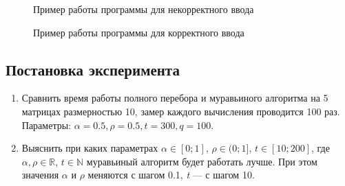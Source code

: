 \documentclass[a4paper,12pt]{article}
\begin{document}
\begin{figure}[h!]
\caption{
Пример работы программы для некорректного ввода}
\label{fig:t0}
\end{figure}

\begin{figure}[h!]
\caption{
Пример работы программы для корректного ввода}
\label{fig:t1}
\end{figure}

\subsection{Постановка эксперимента}

\begin{enumerate}
\item Сравнить время работы полного перебора
и муравьиного алгоритма на 5 матрицах размерностью 10,
замер каждого вычисления проводится 100 раз.
Параметры: $\alpha = 0.5, \rho = 0.5, \textit{t} = 300, \textit{q} = 100$.
\item Выяснить при каких параметрах $\alpha \in [0; 1]$, $\rho \in (0; 1]$, 
 $\textit{t} \in [10; 200]$, где $\alpha, \rho \in \mathbb{R}$, $\textit{t} \in \mathbb{N}$
муравьиный алгоритм будет работать лучше. При этом
значения $\alpha$ и $\rho$ меняются с шагом 0.1, \textit{t} --- с шагом 10.
\end{enumerate}
\end{document}
